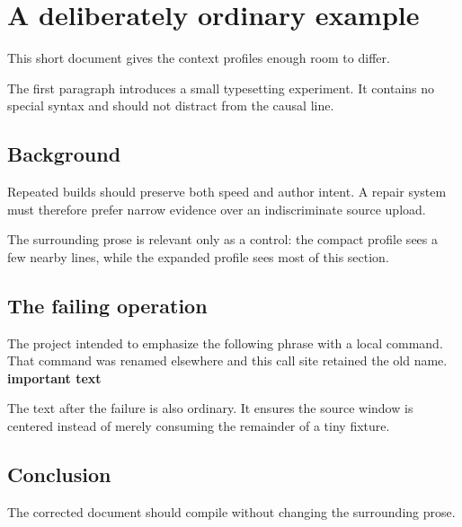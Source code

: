 \documentclass{article}
\newcommand{\widgetize}[1]{\textbf{#1}}
\begin{document}
\section{A deliberately ordinary example}
This short document gives the context profiles enough room to differ.

The first paragraph introduces a small typesetting experiment. It contains no
special syntax and should not distract from the causal line.

\subsection{Background}
Repeated builds should preserve both speed and author intent. A repair system
must therefore prefer narrow evidence over an indiscriminate source upload.

The surrounding prose is relevant only as a control: the compact profile sees
a few nearby lines, while the expanded profile sees most of this section.

\subsection{The failing operation}
The project intended to emphasize the following phrase with a local command.
That command was renamed elsewhere and this call site retained the old name.
\widgetize{important text}

The text after the failure is also ordinary. It ensures the source window is
centered instead of merely consuming the remainder of a tiny fixture.

\subsection{Conclusion}
The corrected document should compile without changing the surrounding prose.
\end{document}
